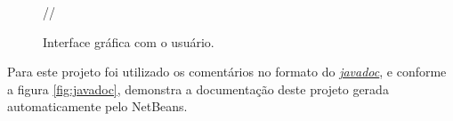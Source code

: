 \begin{figure}[H]
  //
  \caption{Interface gráfica com o usuário.}\label{fig:face}
\end{figure}




\par Para este projeto foi utilizado os comentários no formato do \href{https://docs.oracle.com/javase/8/docs/technotes/tools/windows/javadoc.html}{\textit{javadoc}}, e conforme a figura \ref{fig:javadoc}, demonstra a documentação deste projeto gerada automaticamente pelo NetBeans.

